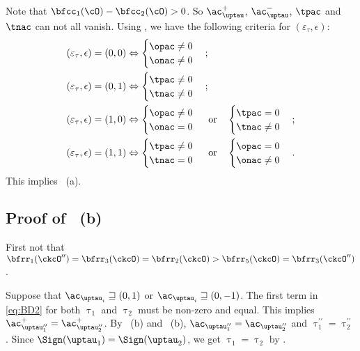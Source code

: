 \documentclass[12pt,a4paper]{amsart}
\def\pac#1{\ac_{#1}^+}
\def\nac#1{\ac_{#1}^-}
\numberwithin{equation}{section}
\theoremstyle{remark}
\def\uptaupp{\uptau^{\prime\prime}}
\begin{document}
Note that $\bfcc_{1}(\cO)-\bfcc_{2}(\cO)>0$. So $\pac{\uptau}$, $\nac{\uptau}$,
$\tpac$ and $\tnac$ can not all vanish.
Using , we have the following criteria for
$(\varepsilon_{\tau},\epsilon)$:
\[
\begin{split}
  (\varepsilon_{\tau},\epsilon) = (0,0) & \Leftrightarrow
  \begin{cases} \opac \neq 0\\ \onac \neq 0 \end{cases};\\
  (\varepsilon_{\tau},\epsilon) = (0,1) & \Leftrightarrow
  \begin{cases} \tpac \neq 0\\ \tnac \neq 0 \end{cases};\\
  (\varepsilon_{\tau},\epsilon) = (1,0) & \Leftrightarrow
  \begin{cases} \opac \neq 0 \\ \onac  = 0 \end{cases} \text{ or} \quad
  \begin{cases} \tpac = 0 \\ \tnac  \neq 0 \end{cases}; \\
  (\varepsilon_{\tau},\epsilon) = (1,1) & \Leftrightarrow
  \begin{cases} \tpac \neq 0 \\ \tnac  = 0 \end{cases} \text{ or} \quad
  \begin{cases} \opac = 0 \\ \onac  \neq 0 \end{cases}.
\end{split}
\]
This implies ~(a).


\subsection*{\bf Proof of ~(b) }
First not that
$\bfrr_{1}(\ckcO'') = \bfrr_{3}(\ckcO)=\bfrr_{2}(\ckcO)>\bfrr_{5}(\ckcO) = \bfrr_{3}(\ckcO'')$.

Suppose that  $\ac_{\uptau_{i}} \sqsupseteq (0,1)$ or $\ac_{\uptau_{i}} \sqsupseteq (0,-1)$.
The first term in \eqref{eq:BD2} for both $\uptau_{1}$ and $\uptau_{2}$ must be
non-zero and equal.
This implies $\pac{\uptaupp_{1}}=\pac{\uptaupp_{2}}$.
By ~(b) and ~(b), $\ac_{\uptaupp_{1}} = \ac_{\uptaupp_{2}}$ and  $\uptaupp_{1}=\uptaupp_{2}$.
Since $\Sign(\uptau_{1})=\Sign(\uptau_{2})$, we get
$\uptau_{1}=\uptau_{2}$ by .
\end{document}
